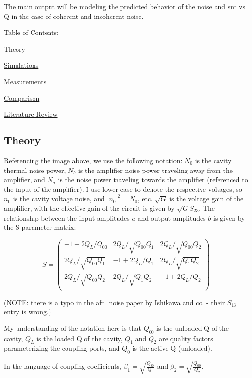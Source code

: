 \documentclass{article}
\begin{document}
The main output will be modeling the predicted behavior of the noise and
snr vs Q in the case of coherent and incoherent noise.

Table of Contents:

\hyperref[theory]{Theory}

\hyperref[simulations]{Simulations}

\hyperref[measurements]{Measurements}

\hyperref[comparison]{Comparison}

\hyperref[literature]{Literature Review}


    \subsection{Theory }


    Referencing the image above, we use the following notation: \(N_0\) is
the cavity thermal noise power, \(N_b\) is the amplifier noise power
traveling away from the amplifier, and \(N_a\) is the noise power
traveling towards the amplifier (referenced to the input of the
amplifier). I use lower case to denote the respective voltages, so
\(n_0\) is the cavity voltage noise, and \(|n_0|^2 = N_0\), etc.
\(\sqrt{G}\) is the voltage gain of the amplifier, with the effective
gain of the circuit is given by \(\sqrt{G}S_{23}\). The relationship
between the input amplitudes \(a\) and output amplitudes \(b\) is given
by the S parameter matrix:

\[
S = \left(\begin{array}{ccc}
-1 + 2Q_L/Q_{00} & 2 Q_L/\sqrt{Q_{00}Q_{1}} & 2Q_L/\sqrt{Q_{00} Q_2} \\
2 Q_L/\sqrt{Q_{00}Q_{1}} & -1 + 2Q_L/Q_{1} & 2Q_L/\sqrt{Q_{1} Q_2} \\
2 Q_L/\sqrt{Q_{00}Q_{2}} & 2Q_L/\sqrt{Q_{1} Q_2} & -1 + 2Q_L/Q_{2} \\
\end{array}\right)
\]

(NOTE: there is a typo in the afr\_noise paper by Ishikawa and co. -
their \(S_{13}\) entry is wrong.)

My understanding of the notation here is that \(Q_{00}\) is the unloaded
Q of the cavity, \(Q_L\) is the loaded Q of the cavity, \(Q_1\) and
\(Q_2\) are quality factors parameterizing the coupling ports, and
\(Q_0\) is the active Q (unloaded).

In the language of coupling coefficients,
\(\beta_1 = \sqrt{\frac{Q_{00}}{Q_1}}\) and
\(\beta_2 = \sqrt{\frac{Q_{00}}{Q_2}}\).
\end{document}
